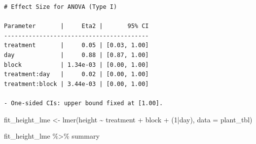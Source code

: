 \documentclass[
  letterpaper,
  DIV=11,
  oneside]{scrreport}
\newenvironment{Shaded}{\begin{snugshade}}{\end{snugshade}}
\newcommand{\AttributeTok}[1]{\textcolor[rgb]{0.40,0.45,0.13}{#1}}
\newcommand{\DecValTok}[1]{\textcolor[rgb]{0.68,0.00,0.00}{#1}}
\newcommand{\FunctionTok}[1]{\textcolor[rgb]{0.28,0.35,0.67}{#1}}
\newcommand{\NormalTok}[1]{\textcolor[rgb]{0.00,0.23,0.31}{#1}}
\newcommand{\OtherTok}[1]{\textcolor[rgb]{0.00,0.23,0.31}{#1}}
\newcommand{\SpecialCharTok}[1]{\textcolor[rgb]{0.37,0.37,0.37}{#1}}
\begin{document}
\begin{verbatim}
# Effect Size for ANOVA (Type I)

Parameter       |     Eta2 |       95% CI
-----------------------------------------
treatment       |     0.05 | [0.03, 1.00]
day             |     0.88 | [0.87, 1.00]
block           | 1.34e-03 | [0.00, 1.00]
treatment:day   |     0.02 | [0.00, 1.00]
treatment:block | 3.44e-03 | [0.00, 1.00]

- One-sided CIs: upper bound fixed at [1.00].
\end{verbatim}

\begin{Shaded}
\begin{Highlighting}[]
\NormalTok{fit\_height\_lme }\OtherTok{\textless{}{-}} \FunctionTok{lmer}\NormalTok{(height }\SpecialCharTok{\textasciitilde{}}\NormalTok{ treatment }\SpecialCharTok{+}\NormalTok{ block }\SpecialCharTok{+}\NormalTok{ (}\DecValTok{1}\SpecialCharTok{|}\NormalTok{day), }
                       \AttributeTok{data =}\NormalTok{ plant\_tbl)}

\NormalTok{fit\_height\_lme }\SpecialCharTok{\%\textgreater{}\%}\NormalTok{ summary}
\end{Highlighting}
\end{Shaded}
\end{document}
